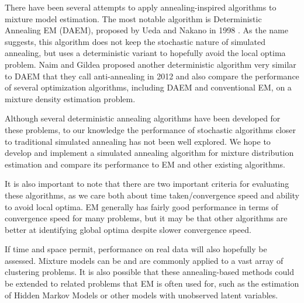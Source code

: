 \documentclass{article}
\theoremstyle{definition}
\begin{document}
There have been several attempts to apply annealing-inspired algorithms to mixture model estimation. The most notable algorithm is Deterministic Annealing EM (DAEM), proposed by Ueda and Nakano in 1998 \cite{uedanakano98}. As the name suggests, this algorithm does not keep the stochastic nature of simulated annealing, but uses a deterministic variant to hopefully avoid the local optima problem. Naim and Gildea proposed another deterministic algorithm very similar to DAEM that they call anti-annealing in 2012 \cite{naimgildea12} and also compare the performance of several optimization algorithms, including DAEM and conventional EM, on a mixture density estimation problem.

Although several deterministic annealing algorithms have been developed for these problems, to our knowledge the performance of stochastic algorithms closer to traditional simulated annealing has not been well explored. We hope to develop and implement a simulated annealing algorithm for mixture distribution estimation and compare its performance to EM and other existing algorithms.

It is also important to note that there are two important criteria for evaluating these algorithms, as we care both about time taken/convergence speed and ability to avoid local optima. EM generally has fairly good performance in terms of convergence speed for many problems, but it may be that other algorithms are better at identifying global optima despite slower convergence speed.

If time and space permit, performance on real data will also hopefully be assessed. Mixture models can be and are commonly applied to a vast array of clustering problems. It is also possible that these annealing-based methods could be extended to related problems that EM is often used for, such as the estimation of Hidden Markov Models or other models with unobserved latent variables.







\end{document}
